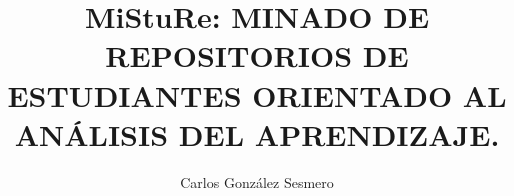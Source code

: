 \documentclass[a4paper, 12pt]{book}
\title{MiStuRe: MINADO DE REPOSITORIOS DE ESTUDIANTES ORIENTADO AL ANÁLISIS DEL APRENDIZAJE.}
\author{Carlos González Sesmero}
\begin{document}
\renewcommand{\refname}{Bibliografía}  %
\renewcommand{\appendixname}{Apéndice}






% 

\cleardoublepage








%


\end{document}
